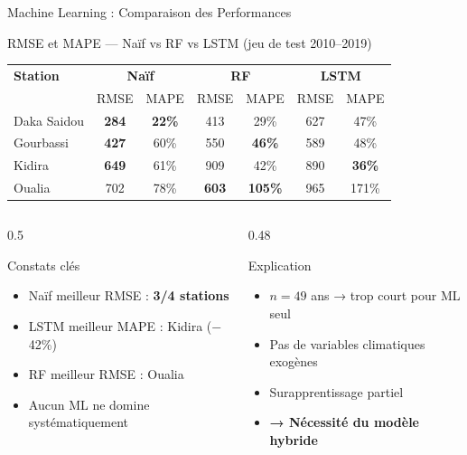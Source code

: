 \documentclass[aspectratio=169, 9pt]{beamer}
\begin{document}
\begin{frame}{Machine Learning : Comparaison des Performances}
\begin{block}{RMSE et MAPE --- Naïf vs RF vs LSTM (jeu de test 2010--2019)}
\centering
\small
\begin{tabular}{lcccccc}
  \toprule
  \textbf{Station} &
  \multicolumn{2}{c}{\textbf{Naïf}} &
  \multicolumn{2}{c}{\textbf{RF}} &
  \multicolumn{2}{c}{\textbf{LSTM}} \\
  & RMSE & MAPE & RMSE & MAPE & RMSE & MAPE \\
  \midrule
  Daka Saidou &
  \textbf{284} & \textbf{22\%} &
  413 & 29\% & 627 & 47\% \\
  Gourbassi &
  \textbf{427} & 60\% &
  550 & \textbf{46\%} & 589 & 48\% \\
  Kidira &
  \textbf{649} & 61\% &
  909 & 42\% & 890 & \textbf{36\%} \\
  Oualia &
  702 & 78\% &
  \textbf{603} & \textbf{105\%} &
  965 & 171\% \\
  \bottomrule
\end{tabular}
\end{block}
\vspace{0.15cm}
\begin{columns}
\begin{column}{0.5\textwidth}
  \begin{alertblock}{Constats clés}
  \small
    \begin{itemize}
      \item Naïf meilleur RMSE : \textbf{3/4 stations}
      \item LSTM meilleur MAPE : Kidira ($-$42\%)
      \item RF meilleur RMSE : Oualia
      \item Aucun ML ne domine systématiquement
    \end{itemize}
  \end{alertblock}
\end{column}
\begin{column}{0.48\textwidth}
  \begin{block}{Explication}
  \small
    \begin{itemize}
      \item $n = 49$ ans → trop court pour ML seul
      \item Pas de variables climatiques exogènes
      \item Surapprentissage partiel
      \item \textbf{→ Nécessité du modèle hybride}
    \end{itemize}
  \end{block}
\end{column}
\end{columns}
\end{frame}
\end{document}
